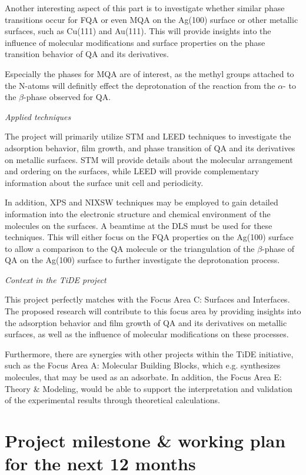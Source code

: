 \documentclass[11pt, a4paper]{scrreprt}
\begin{document}
Another interesting aspect of this part is to investigate whether similar phase transitions occur for \ac{FQA} or even \ac{MQA} on the Ag(100) surface or other metallic surfaces, such as Cu(111) and Au(111). This will provide insights into the influence of molecular modifications and surface properties on the phase transition behavior of \ac{QA} and its derivatives.

Especially the phases for \ac{MQA} are of interest, as the methyl groups attached to the N-atoms will definitly effect the deprotonation of the reaction from the $\alpha$- to the $\beta$-phase observed for \ac{QA}.

\textit{Applied techniques}

The project will primarily utilize \ac{STM} and \ac{LEED} techniques to investigate the adsorption behavior, film growth, and phase transition of \ac{QA} and its derivatives on metallic surfaces. \Ac{STM} will provide details about the molecular arrangement and ordering on the surfaces, while \ac{LEED} will provide complementary information about the surface unit cell and periodicity.

In addition, \ac{XPS} and \ac{NIXSW} techniques may be employed to gain detailed information into the electronic structure and chemical environment of the molecules on the surfaces. A beamtime at the \ac{DLS} must be used for these techniques. This will either focus on the \ac{FQA} properties on the Ag(100) surface to allow a comparison to the \ac{QA} molecule or the triangulation of the $\beta$-phase of \ac{QA} on the Ag(100) surface to further investigate the deprotonation process.

\textit{Context in the TiDE project}

This project perfectly matches with the Focus Area C: Surfaces and Interfaces. The proposed research will contribute to this focus area by providing insights into the adsorption behavior and film growth of \ac{QA} and its derivatives on metallic surfaces, as well as the influence of molecular modifications on these processes.

Furthermore, there are synergies with other projects within the TiDE initiative, such as the Focus Area A: Molecular Building Blocks, which e.g. synthesizes molecules, that may be used as an adsorbate. In addition, the Focus Area E: Theory \& Modeling, would be able to support the interpretation and validation of the experimental results through theoretical calculations.

\newpage
\chapter{Project milestone \& working plan for the next 12 months}
\end{document}
